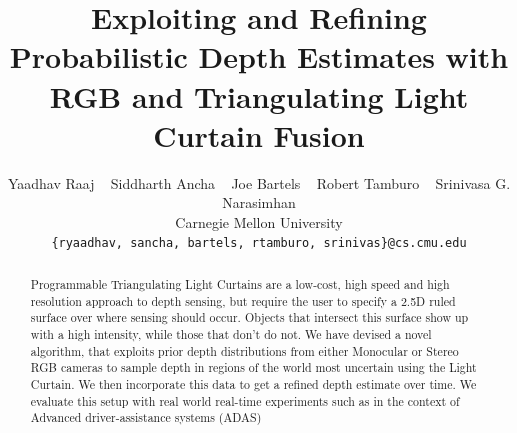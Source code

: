 \documentclass[review]{cvpr}
\begin{document}
\title{Exploiting and Refining Probabilistic Depth Estimates with RGB and Triangulating Light Curtain Fusion}

\author{Yaadhav Raaj ~ Siddharth Ancha ~ Joe Bartels ~ Robert Tamburo ~ Srinivasa G. Narasimhan\\
Carnegie Mellon University\\
{\tt\small \{ryaadhav, sancha, bartels, rtamburo, srinivas\}@cs.cmu.edu}
}

\maketitle

\begin{abstract}
Programmable Triangulating Light Curtains are a low-cost, high speed and high resolution approach to depth sensing, but require the user to specify a 2.5D ruled surface over where sensing should occur. Objects that intersect this surface show up with a high intensity, while those that don't do not. We have devised a novel algorithm, that exploits prior depth distributions from either Monocular or Stereo RGB cameras to sample depth in regions of the world most uncertain using the Light Curtain. We then incorporate this data to get a refined depth estimate over time. We evaluate this setup with real world real-time experiments such as in the context of Advanced driver-assistance systems (ADAS)
\end{abstract}

\end{document}
